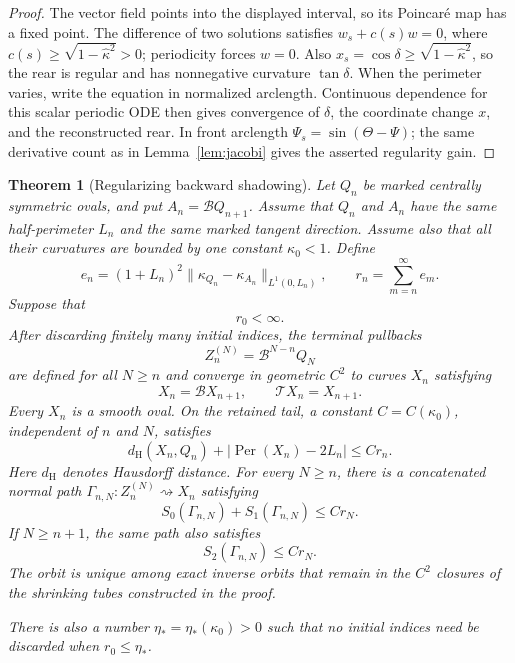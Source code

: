 \documentclass[11pt]{article}
\newtheorem{theorem}{Theorem}[section]
\theoremstyle{remark}
\newcommand{\Tmap}{\mathcal T}
\newcommand{\Bmap}{\mathcal B}
\newcommand{\Per}{\operatorname{Per}}
\begin{document}
\begin{proof}
The vector field points into the displayed interval, so its Poincar\'e map
has a fixed point.  The difference of two solutions satisfies
\(w_s+c(s)w=0\), where
\(c(s)\geq\sqrt{1-\widehat\kappa^2}>0\); periodicity forces \(w=0\).
Also \(x_s=\cos\delta\geq\sqrt{1-\widehat\kappa^2}\), so the rear is
regular and has nonnegative curvature \(\tan\delta\).  When the perimeter
varies, write the equation in normalized arclength.  Continuous dependence for
this scalar periodic ODE then gives convergence of \(\delta\), the coordinate
change \(x\), and the reconstructed rear.  In front
arclength \(\Psi_s=\sin(\Theta-\Psi)\); the same derivative count as in
Lemma~\ref{lem:jacobi} gives the asserted regularity gain.
\end{proof}

\begin{theorem}[Regularizing backward shadowing]\label{thm:shadow}
Let \(Q_n\) be marked centrally symmetric ovals, and put
\(A_n=\Bmap Q_{n+1}\).  Assume that \(Q_n\) and \(A_n\) have the same
half-perimeter \(L_n\) and the same marked tangent direction.  Assume also
that all their curvatures are bounded by one constant \(\kappa_0<1\).  Define
\[
 e_n=(1+L_n)^2
   \|\kappa_{Q_n}-\kappa_{A_n}\|_{L^1(0,L_n)},
 \qquad
 r_n=\sum_{m=n}^{\infty}e_m.
\]
Suppose that
\begin{equation}\label{eq:shadow-hyp}
   r_0<\infty.
\end{equation}
After discarding finitely many initial indices, the terminal pullbacks
\[
   Z_n^{(N)}=\Bmap^{N-n}Q_N
\]
are defined for all \(N\geq n\) and converge in geometric \(C^2\) to
curves \(X_n\) satisfying
\[
   X_n=\Bmap X_{n+1},
   \qquad
   \Tmap X_n=X_{n+1}.
\]
Every \(X_n\) is a smooth oval.  On the retained tail, a constant
\(C=C(\kappa_0)\), independent of \(n\) and \(N\), satisfies
\begin{equation}\label{eq:shadow-model-distance}
 d_{\mathrm H}(X_n,Q_n)+|\Per(X_n)-2L_n|\leq Cr_n.
\end{equation}
Here \(d_{\mathrm H}\) denotes Hausdorff distance.  For every \(N\geq n\), there
is a concatenated normal path
\(\Gamma_{n,N}:Z_n^{(N)}\rightsquigarrow X_n\) satisfying
\begin{equation}\label{eq:shadow-terminal-tail-low}
 S_0(\Gamma_{n,N})+S_1(\Gamma_{n,N})\leq Cr_N.
\end{equation}
If \(N\geq n+1\), the same path also satisfies
\begin{equation}\label{eq:shadow-terminal-tail}
 S_2(\Gamma_{n,N})\leq Cr_N.
\end{equation}
The orbit is unique among exact inverse orbits that remain in the \(C^2\)
closures of the shrinking tubes constructed in the proof.

There is also a number \(\eta_*=\eta_*(\kappa_0)>0\) such that no initial
indices need be discarded when \(r_0\leq\eta_*\).
\end{theorem}
\end{document}
